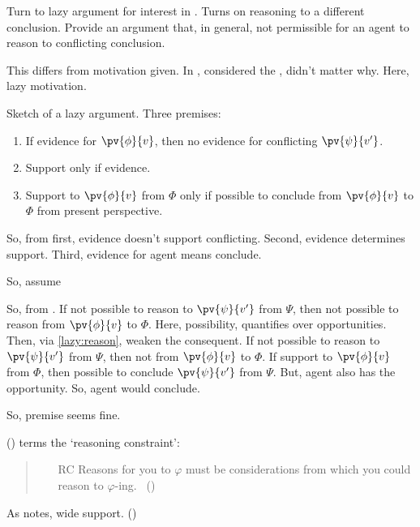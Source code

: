 \begin{note}
  Turn to lazy argument for interest in \requ{}.
  Turns on reasoning to a different conclusion.
  Provide an argument that, in general, not permissible for an agent to reason to conflicting conclusion.

  This differs from motivation given.
  In , considered the \agpe{}, didn't matter why.
  Here, lazy motivation.
\end{note}

\begin{note}
  Sketch of a lazy argument.
  Three premises:
  \begin{enumerate}
  \item
    \label{lazy:evidence-constraint}
    If evidence for \(\pv{\phi}{v}\), then no evidence for conflicting \(\pv{\psi}{v'}\).
  \item
    \label{lazy:evidence}
    Support only if evidence.
  \item
    \label{lazy:reason}
    Support to \(\pv{\phi}{v}\) from \(\Phi\) only if possible to conclude from \(\pv{\phi}{v}\) to \(\Phi\) from present perspective.
  \end{enumerate}

  So, from first, evidence doesn't support conflicting.
  Second, evidence determines support.
  Third, evidence for agent means conclude.

  So, assume 

  So, from \requ{}.
  If not possible to reason to \(\pv{\psi}{v'}\) from \(\Psi\), then not possible to reason from \(\pv{\phi}{v}\) to \(\Phi\).
  Here, possibility, quantifies over opportunities.
  Then, via \ref{lazy:reason}, weaken the consequent.
  If not possible to reason to \(\pv{\psi}{v'}\) from \(\Psi\), then not \support{} from \(\pv{\phi}{v}\) to \(\Phi\).
  If support to \(\pv{\phi}{v}\) from \(\Phi\), then possible to conclude \(\pv{\psi}{v'}\) from \(\Psi\).
  But, agent also has the opportunity.
  So, agent would conclude.

  So, premise seems fine.

  \citeauthor{Way:2016vq} (\citeyear{Way:2016vq}) terms the `reasoning constraint':

  \begin{quote}
    \begin{enumerate}
    \item[RC] Reasons for you to \(\varphi\) must be considerations from which you could reason to \(\varphi\)-ing.%
      \mbox{ }\hfill\mbox{(\citeyear[806]{Way:2016vq})}
    \end{enumerate}
  \end{quote}
  As \citeauthor{Way:2016vq} notes, wide support. (\citeyear[806]{Way:2016vq})


\end{note}
